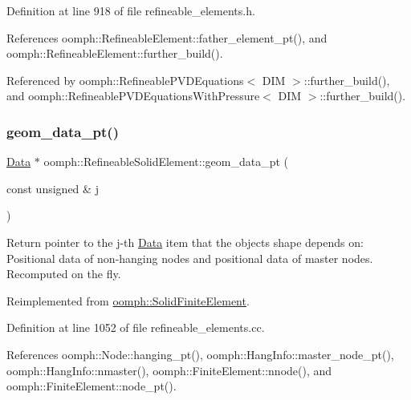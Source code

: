 Definition at line 918 of file refineable\+\_\+elements.\+h.



References oomph\+::\+Refineable\+Element\+::father\+\_\+element\+\_\+pt(), and oomph\+::\+Refineable\+Element\+::further\+\_\+build().



Referenced by oomph\+::\+Refineable\+P\+V\+D\+Equations$<$ D\+I\+M $>$\+::further\+\_\+build(), and oomph\+::\+Refineable\+P\+V\+D\+Equations\+With\+Pressure$<$ D\+I\+M $>$\+::further\+\_\+build().

\mbox{\label{classoomph_1_1RefineableSolidElement_a3f20de56e3a920644b01dac184f67ef1}} 
\subsubsection{\texorpdfstring{geom\+\_\+data\+\_\+pt()}{geom\_data\_pt()}}
{\footnotesize\ttfamily \hyperlink{classoomph_1_1Data}{Data} $\ast$ oomph\+::\+Refineable\+Solid\+Element\+::geom\+\_\+data\+\_\+pt (\begin{DoxyParamCaption}\item[{const unsigned \&}]{j }\end{DoxyParamCaption})\hspace{0.3cm}{\ttfamily [virtual]}}



Return pointer to the j-\/th \hyperlink{classoomph_1_1Data}{Data} item that the object\textquotesingle{}s shape depends on\+: Positional data of non-\/hanging nodes and positional data of master nodes. Recomputed on the fly. 



Reimplemented from \hyperlink{classoomph_1_1SolidFiniteElement_a2457ad75b45257b536090d9b1a6f1331}{oomph\+::\+Solid\+Finite\+Element}.



Definition at line 1052 of file refineable\+\_\+elements.\+cc.



References oomph\+::\+Node\+::hanging\+\_\+pt(), oomph\+::\+Hang\+Info\+::master\+\_\+node\+\_\+pt(), oomph\+::\+Hang\+Info\+::nmaster(), oomph\+::\+Finite\+Element\+::nnode(), and oomph\+::\+Finite\+Element\+::node\+\_\+pt().


